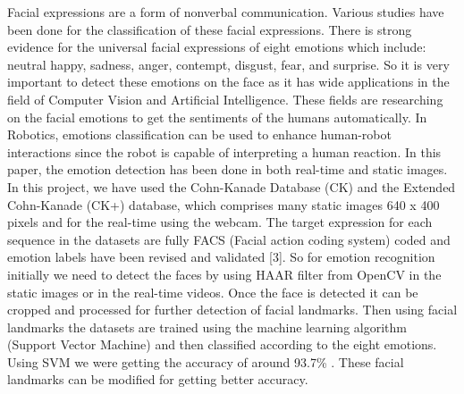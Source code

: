 \documentclass[a4paper,12pt,oneside]{article}
\begin{document}
Facial expressions are a form of nonverbal
communication. Various studies have been done for the
classification of these facial expressions. There is strong
evidence for the universal facial expressions of eight
emotions which include: neutral happy, sadness, anger,
contempt, disgust, fear, and surprise. So it is very
important to detect these emotions on the face as it has
wide applications in the field of Computer Vision and
Artificial Intelligence. These fields are researching on
the facial emotions to get the sentiments of the humans
automatically. In Robotics, emotions classification can
be used to enhance human-robot interactions since the
robot is capable of interpreting a human reaction. In
this paper, the emotion detection has been done in both
real-time and static images. In this project, we have used
the Cohn-Kanade Database (CK) and the Extended
Cohn-Kanade (CK+) database, which comprises many
static images 640 x 400 pixels and for the real-time using
the webcam. The target expression for each sequence in
the datasets are fully FACS (Facial action coding
system) coded and emotion labels have been revised and
validated [3]. So for emotion recognition initially we
need to detect the faces by using HAAR filter from
OpenCV in the static images or in the real-time videos.
Once the face is detected it can be cropped and processed
for further detection of facial landmarks. Then using
facial landmarks the datasets are trained using the
machine learning algorithm (Support Vector Machine)
and then classified according to the eight emotions.
Using SVM we were getting the accuracy of around
93.7\% . These facial landmarks can be modified for
getting better accuracy.
\setlength{\baselineskip}{1.0\baselineskip}
\newpage
\begin{center}
\tableofcontents
\end{center}


\newpage
\thispagestyle{plain}
\begin{center}
\vspace{5mm}
\listoffigures
\vspace{5mm}

\end{center}





\newpage
\rfoot{\thepage}


\end{document}
